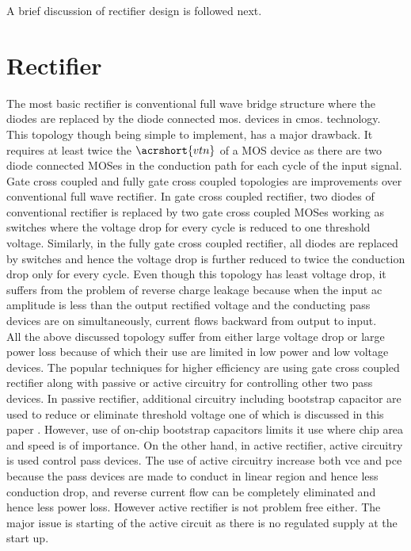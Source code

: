 \documentclass[12pt,a4paper,UKenglish]{article}
\begin{document}
A brief discussion of rectifier design is followed next.

\newpage

\section{Rectifier}
The most basic rectifier is conventional full wave bridge structure where the diodes are replaced by the diode connected \acrshort{mos}. devices in \acrshort{cmos}. technology. This topology though being simple to implement, has a major drawback. It requires at least twice the $\acrshort{vtn}$ of a MOS device as there are two diode connected MOSes in the conduction path for each cycle of the input signal.  \\

Gate cross coupled and fully gate cross coupled topologies are improvements over conventional full wave rectifier. In gate cross coupled rectifier, two diodes of conventional rectifier is replaced by two gate cross coupled MOSes working as switches where the voltage drop for every cycle is reduced to one threshold voltage. Similarly, in the fully gate cross coupled rectifier, all diodes are replaced by switches and hence the voltage drop is further reduced to twice the conduction drop only for every cycle. Even though this topology has least voltage drop, it suffers from the problem of reverse charge leakage because when the input ac amplitude is less than the output rectified voltage and the conducting pass devices are on simultaneously, current flows backward from output to input. \\

All the above discussed topology suffer from either large voltage drop or large power loss because of which their use are limited in low power and low voltage devices. The popular techniques for higher efficiency are using gate cross coupled rectifier along with passive or active circuitry  for controlling other two pass devices. In passive rectifier, additional circuitry including bootstrap capacitor are used to reduce or eliminate threshold voltage one of which is discussed in this paper \cite{rectboot}. However, use of on-chip bootstrap capacitors limits it use where chip area and speed is of importance. On the other hand, in active rectifier, active circuitry is used control pass devices. The use of active circuitry increase both  \gls{vce} and  \gls{pce} because the pass devices are made to conduct in linear region and hence less conduction drop, and reverse current flow can be completely eliminated and hence less power loss. However active rectifier is not problem free either. The major issue is starting of the active circuit as there is no regulated supply at the start up. \\
\end{document}
